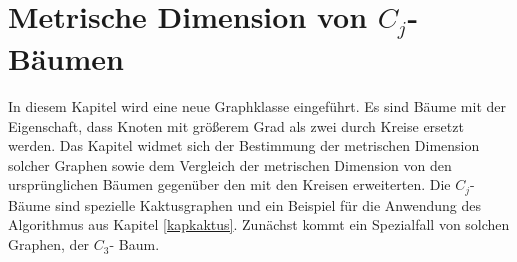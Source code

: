 \newpage
\chapter{Metrische Dimension von $C_j$- Bäumen}
\label{kapcjbaume}
\vspace{-2mm}
In diesem Kapitel wird eine neue Graphklasse eingeführt. Es sind Bäume mit der Eigenschaft, dass Knoten mit größerem Grad als zwei durch Kreise ersetzt werden. Das Kapitel widmet sich der Bestimmung der metrischen Dimension solcher Graphen sowie dem Vergleich der metrischen Dimension von den ursprünglichen Bäumen gegenüber den mit den Kreisen erweiterten. Die $C_j$- Bäume sind spezielle Kaktusgraphen und ein Beispiel für die Anwendung des Algorithmus aus Kapitel \ref{kapkaktus}. Zunächst kommt ein Spezialfall von solchen Graphen, der $C_3$- Baum.
\vspace{-3mm}
